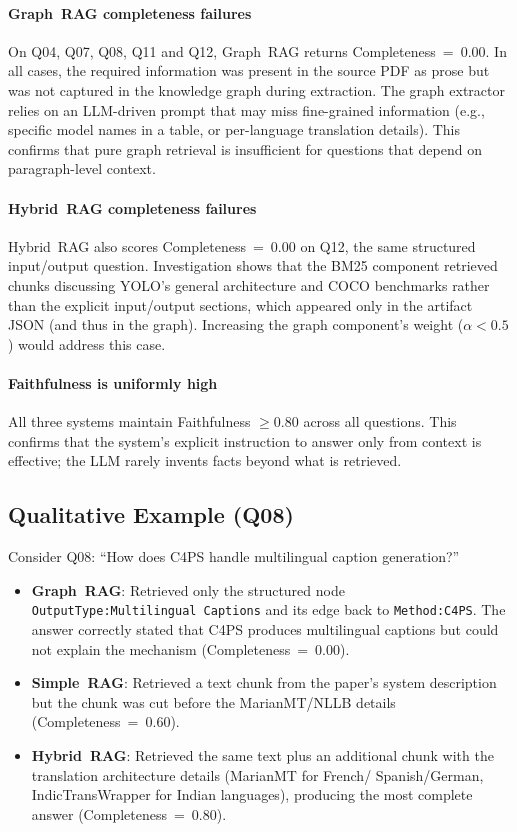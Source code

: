 \documentclass[conference]{IEEEtran}
\begin{document}
\paragraph{Graph~RAG completeness failures}
On Q04, Q07, Q08, Q11 and Q12, Graph~RAG returns
Completeness~=~0.00. In all cases, the required information was present
in the source PDF as prose but was not captured in the knowledge graph
during extraction. The graph extractor relies on an LLM-driven
prompt that may miss fine-grained information (e.g., specific model
names in a table, or per-language translation details). This confirms
that pure graph retrieval is insufficient for questions that depend on
paragraph-level context.

\paragraph{Hybrid~RAG completeness failures}
Hybrid~RAG also scores Completeness~=~0.00 on Q12, the same structured
input/output question. Investigation shows that the BM25 component
retrieved chunks discussing YOLO's general architecture and COCO
benchmarks rather than the explicit input/output sections, which
appeared only in the artifact JSON (and thus in the graph). Increasing
the graph component's weight ($\alpha < 0.5$) would address this case.

\paragraph{Faithfulness is uniformly high}
All three systems maintain Faithfulness $\geq 0.80$ across all
questions. This confirms that the system's explicit instruction to
answer only from context is effective; the LLM rarely invents facts
beyond what is retrieved.

\subsection{Qualitative Example (Q08)}
\label{sec:qualitative}

Consider Q08: ``How does C4PS handle multilingual caption generation?''

\begin{itemize}
  \item \textbf{Graph~RAG}: Retrieved only the structured node
  \texttt{OutputType:Multilingual~Captions} and its edge back to
  \texttt{Method:C4PS}. The answer correctly stated that C4PS produces
  multilingual captions but could not explain the mechanism
  (Completeness~=~0.00).
  \item \textbf{Simple~RAG}: Retrieved a text chunk from the paper's
  system description but the chunk was cut before the MarianMT/NLLB
  details (Completeness~=~0.60).
  \item \textbf{Hybrid~RAG}: Retrieved the same text plus an additional
  chunk with the translation architecture details (MarianMT for French/
  Spanish/German, IndicTransWrapper for Indian languages), producing the
  most complete answer (Completeness~=~0.80).
\end{itemize}
\end{document}
